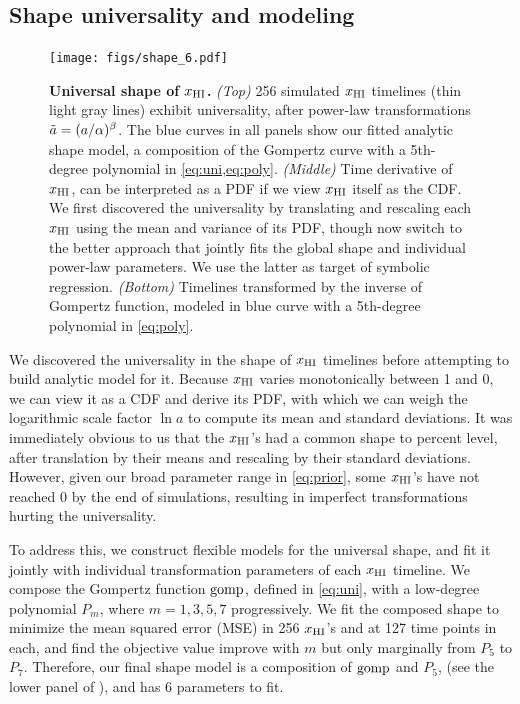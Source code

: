 \subsection*{Shape universality and modeling}
\label{ssec:shape}

\begin{figure}[tb]
\centering
\texttt{[image: figs/shape\_6.pdf]}
\caption{\textbf{Universal shape of $x_{\mathrm{HI}}$.}
\emph{(Top)} 256 simulated $x_{\mathrm{HI}}$ timelines (thin light gray lines)
exhibit universality, after power-law transformations $\tilde{a} =
(a/\alpha)^\beta$.
The blue curves in all panels show our fitted analytic shape model, a
composition of the Gompertz curve with a 5th-degree polynomial in
\cref{eq:uni,eq:poly}.
\emph{(Middle)} Time derivative of $x_{\mathrm{HI}}$, can be interpreted as a PDF
if we view $x_{\mathrm{HI}}$ itself as the CDF.
We first discovered the universality by translating and rescaling each
$x_{\mathrm{HI}}$ using the mean and variance of its PDF, though now switch to the
better approach that jointly fits the global shape and individual
power-law parameters.
We use the latter as target of symbolic regression.
\emph{(Bottom)} Timelines transformed by the inverse of Gompertz
function, modeled in blue curve with a 5th-degree polynomial in
\cref{eq:poly}.}
\label{fig:shape}
\end{figure}

We discovered the universality in the shape of $x_{\mathrm{HI}}$ timelines before
attempting to build analytic model for it.
Because $x_{\mathrm{HI}}$ varies monotonically between 1 and 0, we can view it as
a CDF and derive its PDF, with which we can weigh the logarithmic scale
factor $\ln a$ to compute its mean and standard deviations.
It was immediately obvious to us that the $x_{\mathrm{HI}}$'s had a common shape
to percent level, after translation by their means and rescaling by
their standard deviations.
However, given our broad parameter range in \cref{eq:prior}, some
$x_{\mathrm{HI}}$'s have not reached 0 by the end of simulations, resulting in
imperfect transformations hurting the universality.

To address this, we construct flexible models for the universal shape,
and fit it jointly with individual transformation parameters of each
$x_{\mathrm{HI}}$ timeline.
We compose the Gompertz function $\mathrm{gomp}$, defined in \cref{eq:uni}, with
a low-degree polynomial $P_m$, where $m = 1, 3, 5, 7$ progressively.
We fit the composed shape to minimize the mean squared error (MSE) in
256 $x_{\mathrm{HI}}$'s and at 127 time points in each, and find the objective
value improve with $m$ but only marginally from $P_5$ to $P_7$.
Therefore, our final shape model is a composition of $\mathrm{gomp}$ and $P_5$,
(see the lower panel of ), and has 6 parameters to fit.

